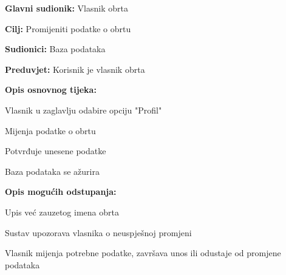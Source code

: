 				\noindent {}
					\begin{packed_item}
	
						\item \textbf{Glavni sudionik: } Vlasnik obrta
						\item  \textbf{Cilj:} Promijeniti podatke o obrtu
						\item  \textbf{Sudionici:} Baza podataka
						\item  \textbf{Preduvjet:} Korisnik je vlasnik obrta
						\item  \textbf{Opis osnovnog tijeka:}
						
						\item[] \begin{packed_enum}
	
							\item Vlasnik u zaglavlju odabire opciju "Profil"
							\item Mijenja podatke o obrtu
							\item Potvrđuje unesene podatke
							\item Baza podataka se ažurira
							
						\end{packed_enum}
						
						\item  \textbf{Opis mogućih odstupanja:}
						
						\item[] \begin{packed_item}
	
							\item[3.a] Upis već zauzetog imena obrta
							\item[] \begin{packed_enum}
								
								\item Sustav upozorava vlasnika o neuspješnoj promjeni
								\item Vlasnik mijenja potrebne podatke, završava unos ili odustaje od promjene podataka
								
							\end{packed_enum}
							
						\end{packed_item}
					\end{packed_item}

